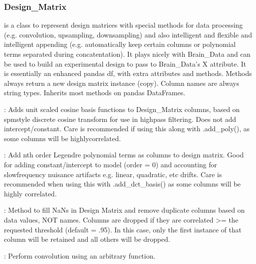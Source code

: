 \documentclass[letterpaper,10pt,english]{sphinxmanual}
\begin{document}
\subsubsection{Design\_Matrix}
\label{\detokenize{content/Glossary:design-matrix}}
 is a class to represent design matrices with special methods for data processing (e.g. convolution, upsampling, downsampling) and also intelligent and flexible and intelligent appending (e.g. auto\sphinxhyphen{}matically keep certain columns or polynomial terms separated during concatentation). It plays nicely with Brain\_Data and can be used to build an experimental design to pass to Brain\_Data’s X attribute. It is essentially an enhanced pandas df, with extra attributes and methods. Methods always return a new design matrix instance (copy). Column names are always string types. Inherits most methods on pandas DataFrames.

: Adds unit scaled cosine basis functions to Design\_Matrix columns, based on spm\sphinxhyphen{}style discrete cosine transform for use in high\sphinxhyphen{}pass filtering. Does not add intercept/constant. Care is recommended if using this along with .add\_poly(), as some columns will be highly\sphinxhyphen{}correlated.

: Add nth order Legendre polynomial terms as columns to design matrix. Good for adding constant/intercept to model (order = 0) and accounting for slow\sphinxhyphen{}frequency nuisance artifacts e.g. linear, quadratic, etc drifts. Care is recommended when using this with .add\_dct\_basis() as some columns will be highly correlated.

: Method to fill NaNs in Design Matrix and remove duplicate columns based on data values, NOT names. Columns are dropped if they are correlated \textgreater{}= the requested threshold (default = .95). In this case, only the first instance of that column will be retained and all others will be dropped.

: Perform convolution using an arbitrary function.
\end{document}
